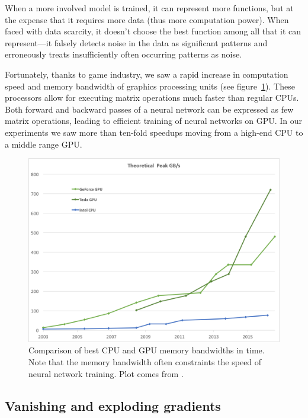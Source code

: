 When a more involved model is trained, it can represent more functions, but at the expense that it requires more data (thus more computation power). When faced with data scarcity, it doesn't choose the best function among all that it can represent---it falsely detects noise in the data as significant patterns and erroneously treats insufficiently often occurring patterns as noise.

Fortunately, thanks to game industry, we saw a rapid increase in computation speed and memory bandwidth of graphics processing units (see figure~\ref{nvidia-speed}). These processors allow for executing matrix operations much faster than regular CPUs. Both forward and backward passes of a neural network can be expressed as few matrix operations, leading to efficient training of neural networks on GPU. In our experiments we saw more than ten-fold speedups moving from a high-end CPU to a middle range GPU.

\begin{figure}[h]
  \includegraphics[width=\linewidth]{images/gpu-bandwidth.png}
  \caption{Comparison of best CPU and GPU memory bandwidths in time. Note that the memory bandwidth often constraints the speed of neural network training. Plot comes from \cite{nvidia-docs}.}\label{nvidia-speed}
\end{figure}

\subsection{Vanishing and exploding gradients}

